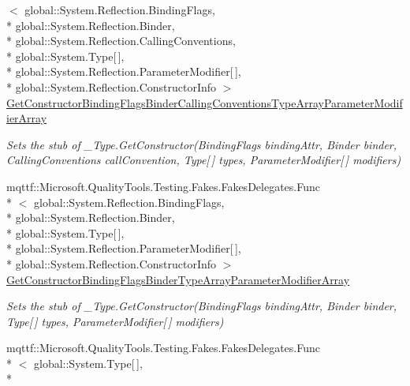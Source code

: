 \begin{DoxyCompactItemize}
$<$ global\-::\-System.\-Reflection.\-Binding\-Flags, \\*
global\-::\-System.\-Reflection.\-Binder, \\*
global\-::\-System.\-Reflection.\-Calling\-Conventions, \\*
global\-::\-System.\-Type\mbox{[}$\,$\mbox{]}, \\*
global\-::\-System.\-Reflection.\-Parameter\-Modifier\mbox{[}$\,$\mbox{]}, \\*
global\-::\-System.\-Reflection.\-Constructor\-Info $>$ \hyperlink{class_system_1_1_runtime_1_1_interop_services_1_1_fakes_1_1_stub___type_a9ff35c7ccf961dfda3f6bf565469f58c}{Get\-Constructor\-Binding\-Flags\-Binder\-Calling\-Conventions\-Type\-Array\-Parameter\-Modifier\-Array}
\begin{DoxyCompactList}\small\item\em Sets the stub of \-\_\-\-Type.\-Get\-Constructor(\-Binding\-Flags binding\-Attr, Binder binder, Calling\-Conventions call\-Convention, Type\mbox{[}$\,$\mbox{]} types, Parameter\-Modifier\mbox{[}$\,$\mbox{]} modifiers)\end{DoxyCompactList}\item 
mqttf\-::\-Microsoft.\-Quality\-Tools.\-Testing.\-Fakes.\-Fakes\-Delegates.\-Func\\*
$<$ global\-::\-System.\-Reflection.\-Binding\-Flags, \\*
global\-::\-System.\-Reflection.\-Binder, \\*
global\-::\-System.\-Type\mbox{[}$\,$\mbox{]}, \\*
global\-::\-System.\-Reflection.\-Parameter\-Modifier\mbox{[}$\,$\mbox{]}, \\*
global\-::\-System.\-Reflection.\-Constructor\-Info $>$ \hyperlink{class_system_1_1_runtime_1_1_interop_services_1_1_fakes_1_1_stub___type_a0d6255d266b018eb804f3a7847b26893}{Get\-Constructor\-Binding\-Flags\-Binder\-Type\-Array\-Parameter\-Modifier\-Array}
\begin{DoxyCompactList}\small\item\em Sets the stub of \-\_\-\-Type.\-Get\-Constructor(\-Binding\-Flags binding\-Attr, Binder binder, Type\mbox{[}$\,$\mbox{]} types, Parameter\-Modifier\mbox{[}$\,$\mbox{]} modifiers)\end{DoxyCompactList}\item 
mqttf\-::\-Microsoft.\-Quality\-Tools.\-Testing.\-Fakes.\-Fakes\-Delegates.\-Func\\*
$<$ global\-::\-System.\-Type\mbox{[}$\,$\mbox{]}, \\*

\end{DoxyCompactItemize}
